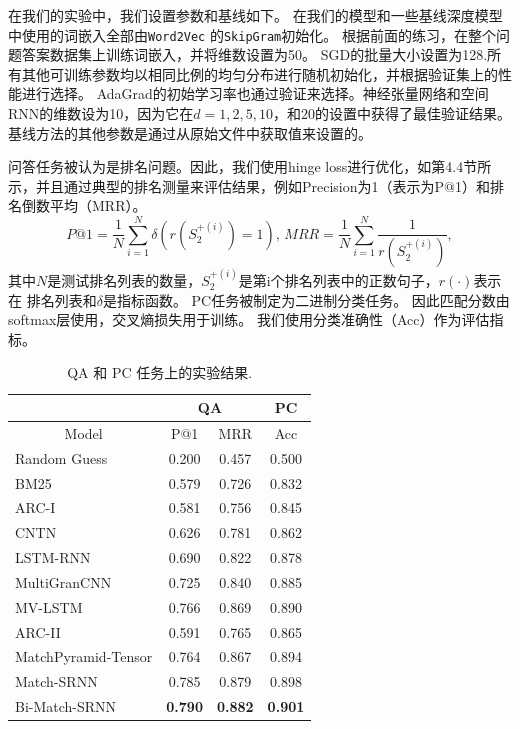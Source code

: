 在我们的实验中，我们设置参数和基线如下。
在我们的模型和一些基线深度模型中使用的词嵌入全部由\texttt {Word2Vec} 的\texttt {SkipGram}初始化。
根据前面的练习，在整个问题答案数据集上训练词嵌入，并将维数设置为50。
SGD的批量大小设置为128.所有其他可训练参数均以相同比例的均匀分布进行随机初始化，并根据验证集上的性能进行选择。 AdaGrad的初始学习率也通过验证来选择。神经张量网络和空间RNN的维数设为10，因为它在$ d = 1,2,5,10，$和$ 20 $的设置中获得了最佳验证结果。基线方法的其他参数是通过从原始文件中获取值来设置的。

问答任务被认为是排名问题。因此，我们使用hinge loss进行优化，如第4.4节所示，并且通过典型的排名测量来评估结果，例如Precision为1（表示为P@1）和排名倒数平均（MRR）。
\begin{equation*}
P@1=\frac{1}{N}\sum_{i=1}^{N}\delta(r(S_2^{+(i)})= 1),\,
MRR=\frac{1}{N}\sum_{i=1}^{N}\frac{1}{r({S_{2}^{+(i)}})},
\end{equation*}
其中$ N $是测试排名列表的数量，$ S_2 ^ {+(i)} $是第i个排名列表中的正数句子，$ r(\cdot)$表示在 排名列表和$ \delta $是指标函数。
PC任务被制定为二进制分类任务。 因此匹配分数由softmax层使用，交叉熵损失用于训练。
我们使用分类准确性（Acc）作为评估指标。

\begin{table}[t]
\begin{tabular}{l|cc|c} \hline
&
\multicolumn{2}{c|}{QA} &
\multicolumn{1}{c}{PC} \\ \hline
\multicolumn{1}{c|}{Model} &
\multicolumn{1}{c}{P@1} &
\multicolumn{1}{c|}{MRR} &
\multicolumn{1}{c}{Acc} \\ \hline
Random Guess			& 0.200 & 0.457 & 0.500   \\
BM25        			& 0.579 & 0.726 & 0.832	    \\ \hline
ARC-I 					& 0.581 & 0.756 	& 0.845	\\
CNTN					& 0.626 & 0.781 	& 0.862 	\\
LSTM-RNN   		  		& 0.690 	& 0.822 	& 0.878 	\\ \hline
MultiGranCNN			& 0.725 	& 0.840 & 0.885		\\
MV-LSTM  				& 0.766	& 0.869	& 0.890	\\ \hline
ARC-II 					& 0.591 & 0.765 	& 0.865	\\
MatchPyramid-Tensor			& 0.764 & 0.867 	& 0.894\\ \hline
Match-SRNN 				& 0.785 & 0.879 & 0.898 \\
Bi-Match-SRNN  			& \textbf{0.790}	& \textbf{0.882} 	& \textbf{0.901}	\\
\hline
\end{tabular}
\centering
\caption{QA 和 PC 任务上的实验结果.}\label{tab:results}
\end{table}

